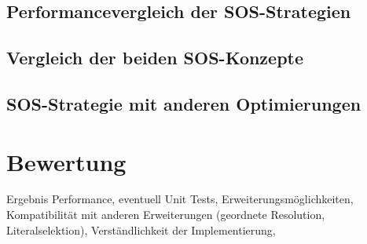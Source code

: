 	\subsection{Performancevergleich der SOS-Strategien}
	\subsection{Vergleich der beiden SOS-Konzepte}
	\subsection{SOS-Strategie mit anderen Optimierungen}
	
\section{Bewertung}

Ergebnis Performance,
eventuell Unit Tests,
Erweiterungsmöglichkeiten,
Kompatibilität mit anderen Erweiterungen (geordnete Resolution, Literalselektion),
Verständlichkeit der Implementierung,

